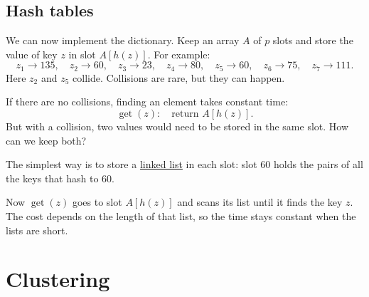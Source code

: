 \documentclass[a4paper,12pt,oneside]{report}
\begin{document}
\section{Hash tables}\label{sec:hash-tables}

We can now implement the dictionary. Keep an array $A$ of $p$ slots
and store the value of key $z$ in slot $A[h(z)]$. For example:
\[
  z_1\to135,\quad z_2\to60,\quad z_3\to23,\quad z_4\to80,\quad
  z_5\to60,\quad z_6\to75,\quad z_7\to111.
\]
Here $z_2$ and $z_5$ collide. Collisions are rare, but they can
happen.

If there are no collisions, finding an element takes constant time:
\[
  \operatorname{get}(z):\quad \text{return } A[h(z)].
\]
But with a collision, two values would need to be stored in the same
slot. How can we keep both?

The simplest way is to store a
\hyperref[def:singly-linked-list]{linked list} in each slot: slot $60$
holds the pairs of all the keys that hash to $60$.

\begin{center}
\end{center}

Now $\operatorname{get}(z)$ goes to slot $A[h(z)]$ and scans its
list until it finds the key $z$. The cost depends on the length of
that list, so the time stays constant when the lists are short.

\endgroup

\chapter{Clustering}\label{ch:clustering}

\begingroup
{}
\end{document}
